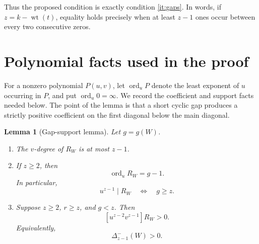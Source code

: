 \documentclass[10pt,a4paper]{article}
\newtheorem{lemma}[theorem]{Lemma}
\newcommand{\wt}{\operatorname{wt}}
\newcommand{\ord}{\operatorname{ord}}
\begin{document}
Thus the proposed condition is exactly condition
\ref{it:gaps}.  In words, if $z=k-\wt(t)$, equality holds precisely
when at least $z-1$ ones occur between every two consecutive zeros.

\section{Polynomial facts used in the proof}

For a nonzero polynomial $P(u,v)$, let $\ord_uP$ denote the least
exponent of $u$ occurring in $P$, and put $\ord_u0=\infty$.
We record the coefficient and support facts needed below.  The point of
the lemma is that a short cyclic gap produces a strictly positive
coefficient on the first diagonal below the main diagonal.


\begin{lemma}[Gap-support lemma]\label{lem:support}
Let $g=g(W)$.

\begin{enumerate}[label=\textup{(\alph*)}]
\item
The $v$-degree of $R_W$ is at most $z-1$.

\item
If $z\geq2$, then
\[
                         \ord_u R_W=g-1.                     \tag{11}
\]
In particular,
\[
                  u^{z-1}\mid R_W
                  \quad\Longleftrightarrow\quad g\geq z.   \tag{12}
\]

\item
Suppose $z\geq2$, $r\geq z$, and $g<z$.  Then
\[
                    [u^{z-2}v^{z-1}]R_W>0.                  \tag{13}
\]
Equivalently,
\[
                         \Delta_{z-1}^-(W)>0.                \tag{14}
\]
\end{enumerate}
\end{lemma}
\end{document}
